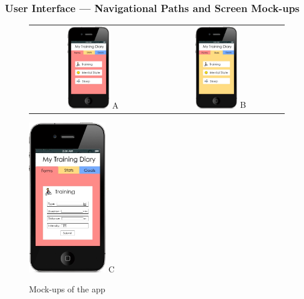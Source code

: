 \documentclass[a4paper, 11pt, titlepage]{article}
\begin{document}
\subsubsection{User Interface --- Navigational Paths and Screen Mock-ups}
\begin{figure}[H]
	\centering
	
	\begin{tabular}{cc}
		\includegraphics[width=0.35\textwidth]{figures/mockups/mockup-a.png} A &
		\includegraphics[width=0.35\textwidth]{figures/mockups/mockup-b.png} B
	\end{tabular}
	
	\includegraphics[width=0.3\textwidth]{figures/mockups/mockup-c.png} C
	\caption{Mock-ups of the app}
	\label{fig:mockups}
\end{figure}
\end{document}
